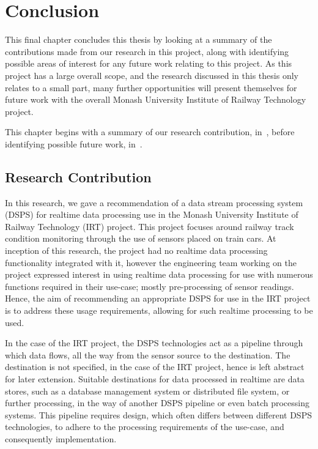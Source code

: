 \chapter{Conclusion}
\label{sec:conclusion}

This final chapter concludes this thesis by looking at a summary of the contributions made from our research in this
project, along with identifying possible areas of interest for any future work relating to this project. As this project
has a large overall scope, and the research discussed in this thesis only relates to a small part, many further opportunities
will present themselves for future work with the overall Monash University Institute of Railway Technology project.

This chapter begins with a summary of our research contribution, in~, before identifying
possible future work, in~.

\section{Research Contribution} %
\label{sub:research_contribution}

In this research, we gave a recommendation of a data stream processing system (DSPS) for realtime data processing use in the
Monash University Institute of Railway Technology (IRT) project. This project focuses around railway track condition monitoring
through the use of sensors placed on train cars. At inception of this research, the project had no realtime data processing
functionality integrated with it, however the engineering team working on the project expressed interest in using realtime
data processing for use with numerous functions required in their use-case; mostly pre-processing of sensor readings. Hence,
the aim of recommending an appropriate DSPS for use in the IRT project is to address these usage requirements, allowing
for such realtime processing to be used.

In the case of the IRT project, the DSPS technologies act as a pipeline through which data flows, all the way from the
sensor source to the destination. The destination is not specified, in the case of the IRT project, hence is left abstract for later extension. Suitable
destinations for data processed in realtime are data stores, such as a database management system or distributed file system,
or further processing, in the way of another DSPS pipeline or even batch processing systems. This pipeline requires design,
which often differs between different DSPS technologies, to adhere to the processing requirements of the use-case, and
consequently implementation.

